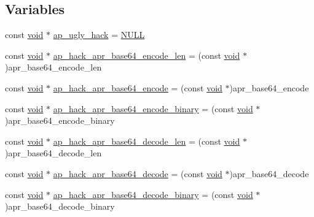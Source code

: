 \subsection*{Variables}
\begin{DoxyCompactItemize}
\item 
const \hyperlink{group__MOD__ISAPI_gacd6cdbf73df3d9eed42fa493d9b621a6}{void} $\ast$ \hyperlink{srclib_2apr-util_2exports_8c_a609db801a1be5cfe0aabaac731cc46e6}{ap\+\_\+ugly\+\_\+hack} = \hyperlink{pcre_8txt_ad7f989d16aa8ca809a36bc392c07fba1}{N\+U\+LL}
\item 
const \hyperlink{group__MOD__ISAPI_gacd6cdbf73df3d9eed42fa493d9b621a6}{void} $\ast$ \hyperlink{srclib_2apr-util_2exports_8c_ac422c296fdc114969e3fd1b095dd9867}{ap\+\_\+hack\+\_\+apr\+\_\+base64\+\_\+encode\+\_\+len} = (const \hyperlink{group__MOD__ISAPI_gacd6cdbf73df3d9eed42fa493d9b621a6}{void} $\ast$)apr\+\_\+base64\+\_\+encode\+\_\+len
\item 
const \hyperlink{group__MOD__ISAPI_gacd6cdbf73df3d9eed42fa493d9b621a6}{void} $\ast$ \hyperlink{srclib_2apr-util_2exports_8c_a94cba1837965636f840f210b200582a7}{ap\+\_\+hack\+\_\+apr\+\_\+base64\+\_\+encode} = (const \hyperlink{group__MOD__ISAPI_gacd6cdbf73df3d9eed42fa493d9b621a6}{void} $\ast$)apr\+\_\+base64\+\_\+encode
\item 
const \hyperlink{group__MOD__ISAPI_gacd6cdbf73df3d9eed42fa493d9b621a6}{void} $\ast$ \hyperlink{srclib_2apr-util_2exports_8c_a6184b674b7cb67a3e2990a63a812e7a8}{ap\+\_\+hack\+\_\+apr\+\_\+base64\+\_\+encode\+\_\+binary} = (const \hyperlink{group__MOD__ISAPI_gacd6cdbf73df3d9eed42fa493d9b621a6}{void} $\ast$)apr\+\_\+base64\+\_\+encode\+\_\+binary
\item 
const \hyperlink{group__MOD__ISAPI_gacd6cdbf73df3d9eed42fa493d9b621a6}{void} $\ast$ \hyperlink{srclib_2apr-util_2exports_8c_a87b1b754733268bf5e791372b583c5f1}{ap\+\_\+hack\+\_\+apr\+\_\+base64\+\_\+decode\+\_\+len} = (const \hyperlink{group__MOD__ISAPI_gacd6cdbf73df3d9eed42fa493d9b621a6}{void} $\ast$)apr\+\_\+base64\+\_\+decode\+\_\+len
\item 
const \hyperlink{group__MOD__ISAPI_gacd6cdbf73df3d9eed42fa493d9b621a6}{void} $\ast$ \hyperlink{srclib_2apr-util_2exports_8c_a6181f7861b075407dbeeab0661b4227c}{ap\+\_\+hack\+\_\+apr\+\_\+base64\+\_\+decode} = (const \hyperlink{group__MOD__ISAPI_gacd6cdbf73df3d9eed42fa493d9b621a6}{void} $\ast$)apr\+\_\+base64\+\_\+decode
\item 
const \hyperlink{group__MOD__ISAPI_gacd6cdbf73df3d9eed42fa493d9b621a6}{void} $\ast$ \hyperlink{srclib_2apr-util_2exports_8c_aa764b6b6d41efda331d27c023cea9519}{ap\+\_\+hack\+\_\+apr\+\_\+base64\+\_\+decode\+\_\+binary} = (const \hyperlink{group__MOD__ISAPI_gacd6cdbf73df3d9eed42fa493d9b621a6}{void} $\ast$)apr\+\_\+base64\+\_\+decode\+\_\+binary

\end{DoxyCompactItemize}
